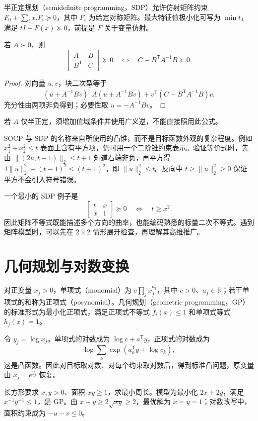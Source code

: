 半正定规划（semidefinite programming，SDP）允许仿射矩阵约束 $F_0+\sum_i x_iF_i\succeq0$，其中 $F_i$ 为给定对称矩阵。最大特征值极小化可写为 $\min t$，满足 $tI-F(x)\succeq0$，前提是 $F$ 关于变量仿射。

\begin{proposition}[Schur 补]
若 $A\succ0$，则
\[
 \begin{bmatrix}A&B\\B^{\mathsf T}&C\end{bmatrix}\succeq0
 \quad\Longleftrightarrow\quad C-B^{\mathsf T}A^{-1}B\succeq0.
\]
\end{proposition}
\begin{proof}
对向量 $u,v$，块二次型等于
\[
 (u+A^{-1}Bv)^{\mathsf T}A(u+A^{-1}Bv)
 +v^{\mathsf T}(C-B^{\mathsf T}A^{-1}B)v.
\]
充分性由两项非负得到；必要性取 $u=-A^{-1}Bv$。
\end{proof}
若 $A$ 仅半正定，须增加值域条件并使用广义逆，不能直接照用此公式。

SOCP 与 SDP 的名称来自所使用的凸锥，而不是目标函数外观的复杂程度。例如 $x_1^2+x_2^2\leq t$ 表面上含有平方项，仍可用一个二阶锥约束表示。验证等价式时，先由 $\|(2u,t-1)\|_2\leq t+1$ 知道右端非负，再平方得 $4\|u\|_2^2+(t-1)^2\leq(t+1)^2$，即 $\|u\|_2^2\leq t$。反向中 $t\geq\|u\|_2^2\geq0$ 保证平方不会引入符号错误。

一个最小的 SDP 例子是
\[
 \begin{bmatrix}t&x\\x&1\end{bmatrix}\succeq0
 \quad\Longleftrightarrow\quad t\geq x^2.
\]
因此矩阵不等式既能描述多个方向的曲率，也能编码熟悉的标量二次不等式。遇到矩阵模型时，可以先在 $2\times2$ 情形展开检查，再理解其高维推广。

\section{几何规划与对数变换}

对正变量 $x_j>0$，单项式（monomial）为 $c\prod_jx_j^{a_j}$，其中 $c>0$、$a_j\in\mathbb R$；若干单项式的和称为正项式（posynomial）。几何规划（geometric programming，GP）的标准形式为最小化正项式，满足正项式不等式 $f_i(x)\leq1$ 和单项式等式 $h_j(x)=1$。

令 $y_j=\log x_j$。单项式的对数成为 $\log c+a^{\mathsf T}y$，正项式的对数成为
\[
 \log\sum_k\exp(a_k^{\mathsf T}y+\log c_k),
\]
这是凸函数。因此对目标取对数、对每个约束取对数后，得到标准凸问题，原变量由 $x_j=e^{y_j}$ 恢复。

\begin{example}
长方形要求 $x,y>0$、面积 $xy\geq1$，求最小周长。模型为最小化 $2x+2y$，满足 $x^{-1}y^{-1}\leq1$，是 GP。由 $x+y\geq2\sqrt{xy}\geq2$，最优解为 $x=y=1$；对数改写中，面积约束成为 $-u-v\leq0$。
\end{example}

